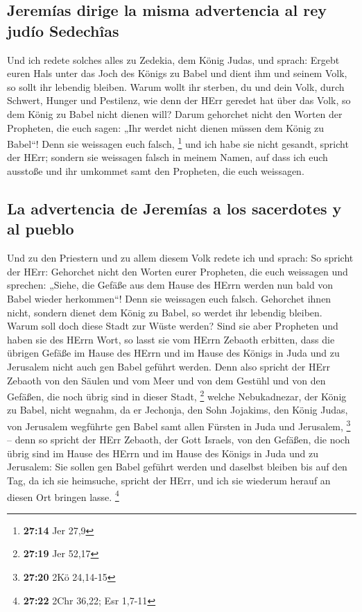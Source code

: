\hypertarget{jeremuxedas-dirige-la-misma-advertencia-al-rey-juduxedo-sedechuxeeas}{%
\subsection{Jeremías dirige la misma advertencia al rey judío
Sedechîas}\label{jeremuxedas-dirige-la-misma-advertencia-al-rey-juduxedo-sedechuxeeas}}

 Und ich redete solches alles zu Zedekia, dem König
Judas, und sprach: Ergebt euren Hals unter das Joch des Königs zu Babel
und dient ihm und seinem Volk, so sollt ihr lebendig bleiben.
 Warum wollt ihr sterben, du und dein Volk, durch
Schwert, Hunger und Pestilenz, wie denn der HErr geredet hat über das
Volk, so dem König zu Babel nicht dienen will?  Darum
gehorchet nicht den Worten der Propheten, die euch sagen: „Ihr werdet
nicht dienen müssen dem König zu Babel``! Denn sie weissagen euch
falsch, \footnote{\textbf{27:14} Jer 27,9}  und ich habe
sie nicht gesandt, spricht der HErr; sondern sie weissagen falsch in
meinem Namen, auf dass ich euch ausstoße und ihr umkommet samt den
Propheten, die euch weissagen.

\hypertarget{la-advertencia-de-jeremuxedas-a-los-sacerdotes-y-al-pueblo}{%
\subsection{La advertencia de Jeremías a los sacerdotes y al
pueblo}\label{la-advertencia-de-jeremuxedas-a-los-sacerdotes-y-al-pueblo}}

 Und zu den Priestern und zu allem diesem Volk redete ich
und sprach: So spricht der HErr: Gehorchet nicht den Worten eurer
Propheten, die euch weissagen und sprechen: „Siehe, die Gefäße aus dem
Hause des HErrn werden nun bald von Babel wieder herkommen``! Denn sie
weissagen euch falsch.  Gehorchet ihnen nicht, sondern
dienet dem König zu Babel, so werdet ihr lebendig bleiben. Warum soll
doch diese Stadt zur Wüste werden?  Sind sie aber
Propheten und haben sie des HErrn Wort, so lasst sie vom HErrn Zebaoth
erbitten, dass die übrigen Gefäße im Hause des HErrn und im Hause des
Königs in Juda und zu Jerusalem nicht auch gen Babel geführt werden.
 Denn also spricht der HErr Zebaoth von den Säulen und
vom Meer und von dem Gestühl und von den Gefäßen, die noch übrig sind in
dieser Stadt, \footnote{\textbf{27:19} Jer 52,17}  welche
Nebukadnezar, der König zu Babel, nicht wegnahm, da er Jechonja, den
Sohn Jojakims, den König Judas, von Jerusalem wegführte gen Babel samt
allen Fürsten in Juda und Jerusalem, \footnote{\textbf{27:20} 2Kö
  24,14-15}  -- denn so spricht der HErr Zebaoth, der
Gott Israels, von den Gefäßen, die noch übrig sind im Hause des HErrn
und im Hause des Königs in Juda und zu Jerusalem:  Sie
sollen gen Babel geführt werden und daselbst bleiben bis auf den Tag, da
ich sie heimsuche, spricht der HErr, und ich sie wiederum herauf an
diesen Ort bringen lasse. \footnote{\textbf{27:22} 2Chr 36,22; Esr
  1,7-11}

